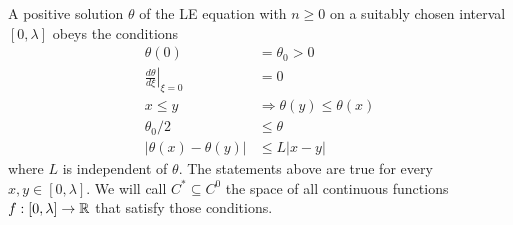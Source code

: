 \begin{lemma}
	\label{5-Zeroes-Lem-LE-Conditions}
	A positive solution $\theta$ of the \ac{LE} equation with $n\geq0$ on a suitably chosen interval $[0,\lambda]$ obeys the conditions
	\begin{align}
		\theta(0) 					&= \theta_0>0\label{5-Zeroes-Equ-LE-Conditions-Initial-1}\\
		\left.\frac{d\theta}{d\xi}\right|_{\xi=0} &= 0 \label{5-Zeroes-Equ-LE-Conditions-Initial-2}\\
		x\leq y 					&\Rightarrow \theta(y)\leq\theta(x)\label{5-Zeroes-Equ-LE-Conditions-3}\\
		\theta_0/2					&\leq \theta \label{5-Zeroes-Equ-LE-Conditions-4}\\
		|\theta(x)-\theta(y)|		&\leq L|x-y|\label{5-Zeroes-Equ-LE-Conditions-5}
	\end{align}
	where $L$ is independent of $\theta$.
	The statements above are true for every $x,y\in[0,\lambda]$.
	We will call $C^*\subseteq C^0$ the space of all continuous functions $f:[0,\lambda]\rightarrow\mathbb{R}$ that satisfy those conditions.
\end{lemma}

